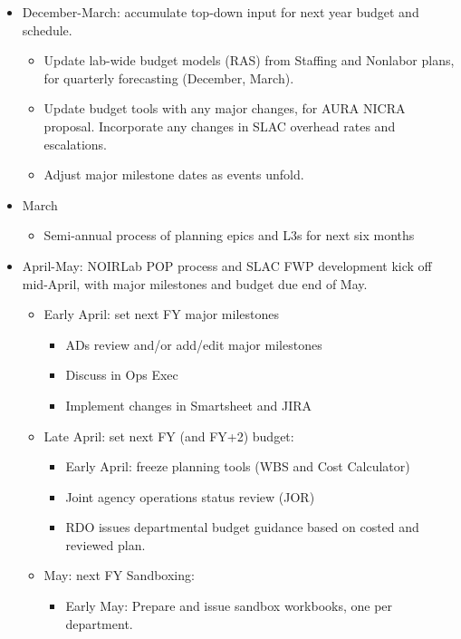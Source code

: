 \begin{itemize}
\item December-March: accumulate top-down input for next year budget and schedule.
   \begin{itemize}
      \item Update lab-wide budget models (\gls{RAS}) from Staffing and Nonlabor plans, for quarterly forecasting (December, March).
      \item Update budget tools with any major changes, for \gls{AURA} \gls{NICRA} proposal. Incorporate any changes in \gls{SLAC} overhead rates and escalations.
      \item Adjust major milestone dates as events unfold.
   \end{itemize}
\item March
   \begin{itemize}
      \item Semi-annual process of planning epics and L3s for next six months
   \end{itemize}
\item April-May: \gls{NOIRLab} \gls{POP} process and \gls{SLAC} FWP development kick off mid-April, with major milestones and budget due end of May.
   \begin{itemize}
      \item Early April: set next \gls{FY} major milestones
         \begin{itemize}
            \item ADs review and/or add/edit major milestones
            \item Discuss in Ops Exec
            \item Implement changes in Smartsheet and \gls{JIRA}
         \end{itemize}
      \item Late April: set next \gls{FY} (and \gls{FY}+2) budget:
         \begin{itemize}
            \item Early April: freeze planning tools (\gls{WBS} and Cost Calculator)
            \item Joint agency operations status review (\gls{JOR})
            \item \gls{RDO} issues departmental budget guidance based on costed and reviewed plan.
         \end{itemize}
      \item May: next \gls{FY} Sandboxing:
         \begin{itemize}
            \item Early May: Prepare and issue sandbox workbooks, one per department.

\end{itemize}
\end{itemize}
\end{itemize}

